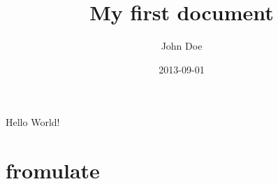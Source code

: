 \documentclass{article}
\title{My first document}
\date{2013-09-01}
\author{John Doe}
\begin{document}
  \maketitle
  \newpage

  Hello World!
  \section{fromulate}
\end{document}
